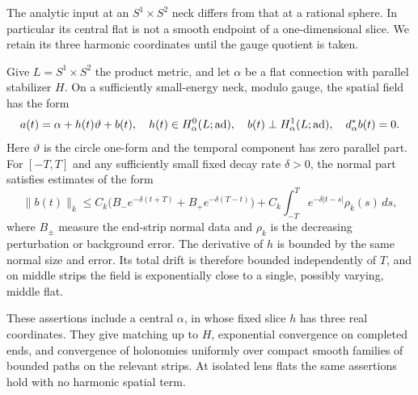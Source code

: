 The analytic input at an $S^1\times S^2$ neck differs from that at
a rational sphere.  In particular its central flat is not a smooth
endpoint of a one-dimensional slice.  We retain its three harmonic
coordinates until the gauge quotient is taken.

\begin{lemma}
\label{lem:ordinary:neck-decay}
Give $L=S^1\times S^2$ the product metric, and let $\alpha$ be a
flat connection with parallel stabilizer $H$.  On a sufficiently
small-energy neck, modulo gauge, the spatial field has the form
\begin{equation}\label{eq:ordinary:harmonic-slice}
 a(t)=\alpha+h(t)\vartheta+b(t),
 \quad h(t)\in H^0_\alpha(L;\operatorname{ad}),
 \quad b(t)\perp H^1_\alpha(L;\operatorname{ad}),
 \quad d_\alpha^*b(t)=0.
\end{equation}
Here $\vartheta$ is the circle one-form and the temporal component
has zero parallel part.  For $[-T,T]$ and any sufficiently small
fixed decay rate $\delta>0$, the normal part satisfies estimates
of the form
\begin{equation}\label{eq:ordinary:normal-decay}
 \|b(t)\|_{k}
 \le C_k\bigl(B_-e^{-\delta(t+T)}
                  +B_+e^{-\delta(T-t)}\bigr)
       +C_k\int_{-T}^T e^{-\delta|t-s|}\rho_k(s)\,ds,
\end{equation}
where $B_\pm$ measure the end-strip normal data and $\rho_k$ is
the decreasing perturbation or background error.  The derivative
of $h$ is bounded by the same normal size and error.  Its total
drift is therefore bounded independently of $T$, and on middle
strips the field is exponentially close to a single, possibly
varying, middle flat.

These assertions include a central $\alpha$, in whose fixed slice
$h$ has three real coordinates.  They give matching up to $H$,
exponential convergence on completed ends, and convergence of
holonomies uniformly over compact smooth families of bounded
paths on the relevant strips.  At isolated lens flats the same
assertions hold with no harmonic spatial term.
\end{lemma}
